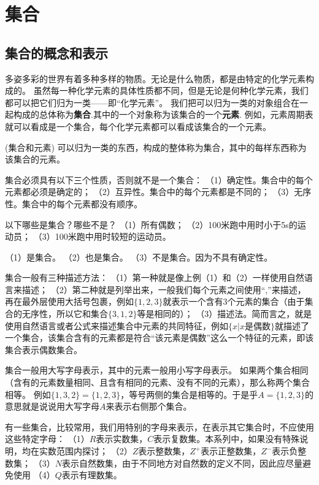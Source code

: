 \section{集合}
\subsection{集合的概念和表示}
多姿多彩的世界有着多种多样的物质。无论是什么物质，都是由特定的化学元素构成的。
虽然每一种化学元素的具体性质都不同，但是无论是何种化学元素，我们都可以把它们归为一类——即“化学元素”。
我们把可以归为一类的对象组合在一起构成的总体称为\textbf{集合}.其中的一个对象称为该集合的一个\textbf{元素}.
例如，元素周期表就可以看成是一个集合，每个化学元素都可以看成该集合的一个元素。
\begin{definition}(集合和元素)
    可以归为一类的东西，构成的整体称为集合，其中的每样东西称为该集合的元素。
\end{definition}

集合必须具有以下三个性质，否则就不是一个集合：
（1）确定性。集合中的每个元素都必须是确定的；
（2）互异性。集合中的每个元素都是不同的；
（3）无序性。集合中的每个元素都没有顺序。

\begin{example}
    以下哪些是集合？哪些不是？
    （1）所有偶数；
    （2）100米跑中用时小于5s的运动员；
    （3）100米跑中用时较短的运动员。
\end{example}

\begin{solution}
    （1）是集合。
    （2）也是集合。
    （3）不是集合。因为不具有确定性。
\end{solution}

集合一般有三种描述方法：
（1）第一种就是像上例（1）和（2）一样使用自然语言来描述；
（2）第二种就是列举出来，一般我们每个元素之间使用“,”来描述，再在最外层使用大括号包裹，例如$\{1,2,3\}$就表示一个含有3个元素的集合（由于集合的无序性，所以它和集合$\{3,1,2\}$等是相同的）；
（3）描述法。简而言之，就是使用自然语言或者公式来描述集合中元素的共同特征，例如$\{x|x$是偶数$\}$就描述了一个集合，该集合含有的元素都是符合“该元素是偶数”这么一个特征的元素，即该集合表示偶数集合。

集合一般用大写字母表示，其中的元素一般用小写字母表示。
如果两个集合相同（含有的元素数量相同、且含有相同的元素、没有不同的元素），那么称两个集合相等。
例如$\{1,3,2\}=\{1,2,3\}$，等号两侧的集合是相等的。于是乎$A=\{1,2,3\}$的意思就是说说用大写字母$A$来表示右侧那个集合。

有一些集合，比较常用，我们用特别的字母来表示，在表示其它集合时，不应使用这些特定字母：
（1）$R$表示实数集，$C$表示复数集。本系列中，如果没有特殊说明，均在实数范围内探讨；
（2）$Z$表示整数集，$Z^+$表示正整数集，$Z^-$表示负整数集；
（3）$N$表示自然数集，由于不同地方对自然数的定义不同，因此应尽量避免使用
（4）$Q$表示有理数集。

